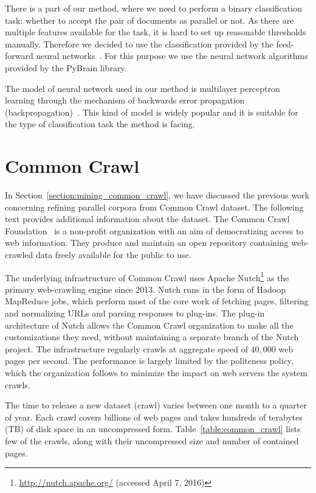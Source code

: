 There is a part of our method, where we need to perform a binary classification task: whether to accept the pair of documents as parallel or not. As there are multiple features available for the task, it is hard to set up reasonable thresholds manually. Therefore we decided to use the classification provided by the feed-forward neural networks~\cite{Sima96}. For this purpose we use the neural network algorithms provided by the PyBrain library. 

The model of neural network used in our method is multilayer perceptron learning through the mechanism of backwards error propagation (backpropagation)~\cite{Rumelhart86}. This kind of model is widely popular and it is suitable for the type of classification task the method is facing.

\section{Common Crawl}
\label{section:common_crawl}

In Section~\ref{section:mining_common_crawl}, we have discussed the previous work concerning refining parallel corpora from Common Crawl dataset. The following text provides additional information about the dataset. The Common Crawl Foundation~\cite{CommonCrawl} is a non-profit organization with an aim of democratizing access to web information. They produce and maintain an open repository containing web-crawled data freely available for the public to use. 

The underlying infrastructure of Common Crawl uses Apache Nutch\footnote{\url{http://nutch.apache.org/} (accessed April 7, 2016)} as the primary web-crawling engine since 2013. Nutch runs in the form of Hadoop MapReduce jobs, which perform most of the core work of fetching pages, filtering and normalizing URLs and parsing responses to plug-ins. The plug-in architecture of Nutch allows the Common Crawl organization to make all the customizations they need, without maintaining a separate branch of the Nutch project. The infrastructure regularly crawls at aggregate speed of $40,000$ web pages per second. The performance is largely limited by the politeness policy, which the organization follows to minimize the impact on web servers the system crawls.

The time to release a new dataset (crawl) varies between one month to a quarter of year. Each crawl covers billions of web pages and takes hundreds of terabytes (TB) of disk space in an uncompressed form. Table~\ref{table:common_crawl} lists few of the crawls, along with their uncompressed size and number of contained pages.

